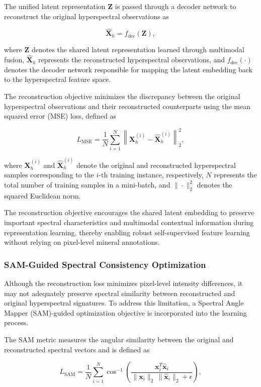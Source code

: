 \documentclass[pdflatex,sn-mathphys-num]{sn-jnl}
\begin{document}
The unified latent representation $\mathbf{Z}$ is passed through a decoder network to reconstruct the original hyperspectral observations as

\[
\hat{\mathbf{X}}_{h}
=
f_{\mathrm{dec}}(\mathbf{Z}),
\]

where $\mathbf{Z}$ denotes the shared latent representation learned through multimodal fusion, $\hat{\mathbf{X}}_{h}$ represents the reconstructed hyperspectral observations, and $f_{\mathrm{dec}}(\cdot)$ denotes the decoder network responsible for mapping the latent embedding back to the hyperspectral feature space.

The reconstruction objective minimizes the discrepancy between the original hyperspectral observations and their reconstructed counterparts using the mean squared error (MSE) loss, defined as

\[
L_{\mathrm{MSE}}
=
\frac{1}{N}
\sum_{i=1}^{N}
\left\|
\mathbf{X}_{h}^{(i)}
-
\hat{\mathbf{X}}_{h}^{(i)}
\right\|_{2}^{2},
\]

where $\mathbf{X}_{h}^{(i)}$ and $\hat{\mathbf{X}}_{h}^{(i)}$ denote the original and reconstructed hyperspectral samples corresponding to the $i$-th training instance, respectively, $N$ represents the total number of training samples in a mini-batch, and $\|\cdot\|_{2}^{2}$ denotes the squared Euclidean norm.

The reconstruction objective encourages the shared latent embedding to preserve important spectral characteristics and multimodal contextual information during representation learning, thereby enabling robust self-supervised feature learning without relying on pixel-level mineral annotations.

\subsubsection{SAM-Guided Spectral Consistency Optimization}
\label{sec:sam}

Although the reconstruction loss minimizes pixel-level intensity differences, it may not adequately preserve spectral similarity between reconstructed and original hyperspectral signatures. To address this limitation, a Spectral Angle Mapper (SAM)-guided optimization objective is incorporated into the learning process.

The SAM metric measures the angular similarity between the original and reconstructed spectral vectors and is defined as

\[
L_{\mathrm{SAM}}
=
\frac{1}{N}
\sum_{i=1}^{N}
\cos^{-1}
\left(
\frac
{\mathbf{x}_{i}^{T}\hat{\mathbf{x}}_{i}}
{\|\mathbf{x}_{i}\|_{2}\,
\|\hat{\mathbf{x}}_{i}\|_{2}+\epsilon}
\right),
\]
\end{document}
